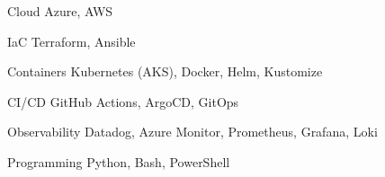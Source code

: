 


\begin{cvskills}


\cvskill
{Cloud} %
{Azure, AWS} %


\cvskill
{IaC} %
{Terraform, Ansible} %


\cvskill
{Containers} %
{Kubernetes (AKS), Docker, Helm, Kustomize} %


\cvskill
{CI/CD} %
{GitHub Actions, ArgoCD, GitOps} %


\cvskill
{Observability} %
{Datadog, Azure Monitor, Prometheus, Grafana, Loki} %


\cvskill
{Programming} %
{Python, Bash, PowerShell} %


\end{cvskills}
